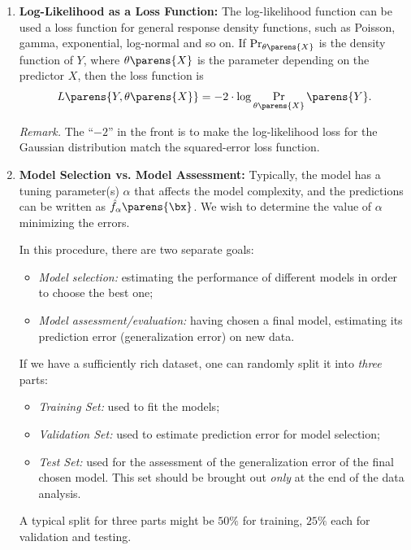 \documentclass[12pt]{article}
\begin{document}
\begin{enumerate}[label=\textbf{\arabic*.}]
	\item \textbf{Log-Likelihood as a Loss Function:} The log-likelihood function can be used a loss function for general response density functions, such as Poisson, gamma, exponential, log-normal and so on. If $\Pr_{\theta \parens{X}}$ is the density function of $Y$, where $\theta \parens{X}$ is the parameter depending on the predictor $X$, then the loss function is 
	\begin{align*}
		L \parens{Y, \theta \parens{X}} = -2 \cdot \log \Pr_{\theta \parens{X}} \parens{Y}. 
	\end{align*}
	
	\textit{Remark.} The ``$-2$'' in the front is to make the log-likelihood loss for the Gaussian distribution match the squared-error loss function. 
	
	\item \textbf{Model Selection vs. Model Assessment:} Typically, the model has a tuning parameter(s) $\alpha$ that affects the model complexity, and the predictions can be written as $\hat{f}_{\alpha} \parens{\bx}$. We wish to determine the value of $\alpha$ minimizing the errors. 
	
	In this procedure, there are two separate goals: 
	\begin{itemize}
		\item \textit{Model selection:} estimating the performance of different models in order to choose the best one; 
		\item \textit{Model assessment/evaluation:} having chosen a final model, estimating its prediction error (generalization error) on new data. 
	\end{itemize}
	If we have a sufficiently rich dataset, one can randomly split it into \emph{three} parts: 
	\begin{itemize}
		\item \textit{Training Set:} used to fit the models; 
		\item \textit{Validation Set:} used to estimate prediction error for model selection; 
		\item  \textit{Test Set:} used for the assessment of the generalization error of the final chosen model. This set should be brought out \emph{only} at the end of the data analysis. 
	\end{itemize}
	A typical split for three parts might be $50\%$ for training, $25\%$ each for validation and testing. 
	
\end{enumerate}
\end{document}
